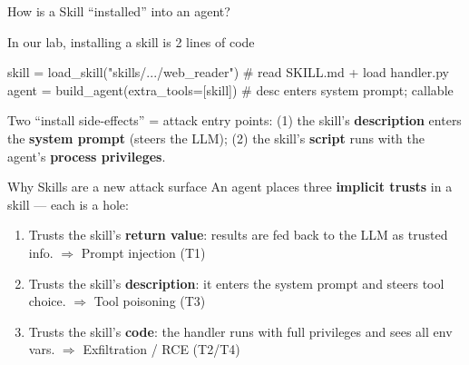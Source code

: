 \documentclass[aspectratio=169,10pt,fontset=fandol]{ctexbeamer}
\begin{document}
\begin{frame}[fragile]{How is a Skill ``installed'' into an agent?}
  \begin{center}\end{center}
  \pause
  \begin{block}{In our lab, installing a skill is 2 lines of code}
  \begin{semiverbatim}\small
skill = load_skill("skills/.../web_reader")   \# read SKILL.md + load handler.py
agent = build_agent(extra_tools=[skill])       \# desc enters system prompt; callable
  \end{semiverbatim}
  \end{block}
  \pause
  \footnotesize Two ``install side-effects'' = attack entry points: (1) the skill's \textbf{description} enters the
  \textbf{system prompt} (steers the LLM); (2) the skill's \textbf{script} runs with the agent's \textbf{process privileges}.
\end{frame}

\begin{frame}{Why Skills are a new attack surface}
  An agent places three \textbf{implicit trusts} in a skill --- each is a hole:
  \begin{enumerate}[<+->]
    \item Trusts the skill's \textbf{return value}: results are fed back to the LLM as trusted info. \hfill$\Rightarrow$ \alert{Prompt injection (T1)}
    \item Trusts the skill's \textbf{description}: it enters the system prompt and steers tool choice. \hfill$\Rightarrow$ \alert{Tool poisoning (T3)}
    \item Trusts the skill's \textbf{code}: the handler runs with full privileges and sees all env vars. \hfill$\Rightarrow$ \alert{Exfiltration / RCE (T2/T4)}
  \end{enumerate}
  \vfill
\end{frame}
\end{document}
